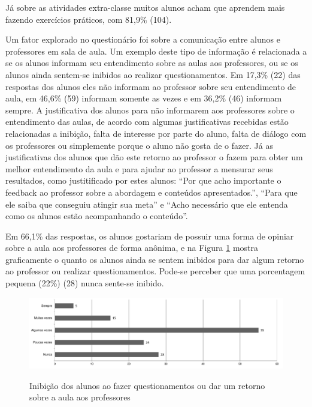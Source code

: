 Já sobre as atividades extra-classe muitos alunos acham que aprendem mais fazendo exercícios práticos, com 81,9\% (104).

Um fator explorado no questionário foi sobre a comunicação entre alunos e professores em sala de aula. Um exemplo deste tipo de informação é relacionada a se os alunos informam seu entendimento sobre as aulas aos professores, ou se os alunos ainda sentem-se inibidos ao realizar questionamentos. Em 17,3\% (22) das respostas dos alunos eles não informam ao professor sobre seu entendimento de aula, em 46,6\% (59) informam somente as vezes e em 36,2\% (46) informam sempre. A justificativa dos alunos para não informarem aos professores sobre o entendimento das aulas, de acordo com algumas justificativas recebidas estão relacionadas a inibição, falta de interesse por parte do aluno, falta de diálogo com os professores ou simplemente porque o aluno não gosta de o fazer. Já as justificativas dos alunos que dão este retorno ao professor o fazem para obter um melhor entendimento da aula e para ajudar ao professor a mensurar seus resultados, como justitificado por estes alunos: ``Por que acho importante o feedback ao professor sobre a abordagem e conteúdos apresentados.'', ``Para que ele saiba que conseguiu atingir sua meta'' e ``Acho necessário que ele entenda como os alunos estão acompanhando o conteúdo''.

Em 66,1\% das respostas, os alunos gostariam de possuir uma forma de opiniar sobre a aula aos professores de forma anônima, e na Figura \ref{fig:grafico_inibido} mostra graficamente o quanto os alunos ainda se sentem inibidos para dar algum retorno ao professor ou realizar questionamentos. Pode-se perceber que uma porcentagem pequena (22\%) (28) nunca sente-se inibido.

\begin{figure}[!h]
\centering
\caption{Inibição dos alunos ao fazer questionamentos ou dar um retorno sobre a aula aos professores}
\includegraphics[width=1.0\textwidth]{pdfs/alunos-professores/pesquisa-inibicao-alunos.pdf} 
\label{fig:grafico_inibido} 
\end{figure}

